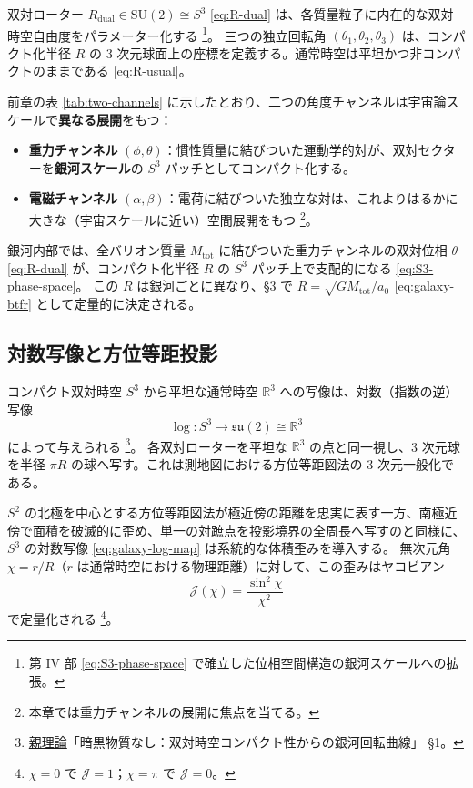 \documentclass[dvipdfmx,a4paper,oneside]{jsbook}
\numberwithin{equation}{chapter}
\begin{document}
双対ローター \(R_{\mathrm{dual}} \in \mathrm{SU}(2) \cong S^3\) \eqref{eq:R-dual} は、各質量粒子に内在的な双対時空自由度をパラメーター化する \footnote{第 IV 部 \eqref{eq:S3-phase-space} で確立した位相空間構造の銀河スケールへの拡張。}。
三つの独立回転角 \((\theta_1, \theta_2, \theta_3)\) は、コンパクト化半径 \(R\) の 3 次元球面上の座標を定義する。通常時空は平坦かつ非コンパクトのままである \eqref{eq:R-usual}。

前章の表 \ref{tab:two-channels} に示したとおり、二つの角度チャンネルは宇宙論スケールで\textbf{異なる展開}をもつ：
\begin{itemize}[leftmargin=2em]
  \item \textbf{重力チャンネル} \((\phi, \theta)\)：慣性質量に結びついた運動学的対が、双対セクターを\textbf{銀河スケール}の \(S^3\) パッチとしてコンパクト化する。
  \item \textbf{電磁チャンネル} \((\alpha, \beta)\)：電荷に結びついた独立な対は、これよりはるかに大きな（宇宙スケールに近い）空間展開をもつ \footnote{本章では重力チャンネルの展開に焦点を当てる。}。
\end{itemize}

銀河内部では、全バリオン質量 \(M_{\mathrm{tot}}\) に結びついた重力チャンネルの双対位相 \(\theta\) \eqref{eq:R-dual} が、コンパクト化半径 \(R\) の \(S^3\) パッチ上で支配的になる \eqref{eq:S3-phase-space}。
この \(R\) は銀河ごとに異なり、§3 で \(R = \sqrt{GM_{\mathrm{tot}}/a_0}\) \eqref{eq:galaxy-btfr} として定量的に決定される。

\subsection{対数写像と方位等距投影}

コンパクト双対時空 \(S^3\) から平坦な通常時空 \(\mathbb{R}^3\) への写像は、対数（指数の逆）写像
\begin{equation}
  \log : S^3 \to \mathfrak{su}(2) \cong \mathbb{R}^3
  \label{eq:galaxy-log-map}
\end{equation}
によって与えられる \footnote{\hyperref[sec:sister-manuscripts]{親理論}「暗黒物質なし：双対時空コンパクト性からの銀河回転曲線」 §1。}。
各双対ローターを平坦な \(\mathbb{R}^3\) の点と同一視し、3 次元球を半径 \(\pi R\) の球へ写す。これは測地図における方位等距図法の 3 次元一般化である。

\(S^2\) の北極を中心とする方位等距図法が極近傍の距離を忠実に表す一方、南極近傍で面積を破滅的に歪め、単一の対蹠点を投影境界の全周長へ写すのと同様に、\(S^3\) の対数写像 \eqref{eq:galaxy-log-map} は系統的な体積歪みを導入する。
無次元角 \(\chi = r/R\)（\(r\) は通常時空における物理距離）に対して、この歪みはヤコビアン
\begin{equation}
  \mathcal{J}(\chi) = \frac{\sin^2 \chi}{\chi^2}
  \label{eq:galaxy-jacobian}
\end{equation}
で定量化される \footnote{\(\chi = 0\) で \(\mathcal{J} = 1\)；\(\chi = \pi\) で \(\mathcal{J} = 0\)。}。
\end{document}
